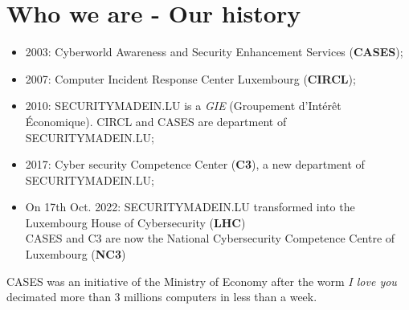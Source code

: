 %
%
\section*{Who we are - Our history}
\begin{frame}
  \begin{center}
    \begin{itemize}
      \item 2003: Cyberworld Awareness and Security Enhancement Services (\textbf{CASES});
      \item 2007: Computer Incident Response Center Luxembourg (\textbf{CIRCL});
      \item 2010: SECURITYMADEIN.LU is a \textit{GIE} (Groupement d’Intérêt Économique). CIRCL and CASES are department of SECURITYMADEIN.LU;
      \item 2017: Cyber security Competence Center (\textbf{C3}), a new department of SECURITYMADEIN.LU;
      \item On 17th Oct. 2022: SECURITYMADEIN.LU transformed into the Luxembourg House of Cybersecurity (\textbf{LHC})\\
        CASES and C3 are now the National Cybersecurity Competence Centre of Luxembourg (\textbf{NC3})
    \end{itemize}
  \end{center}
  CASES was an initiative of the Ministry of Economy after the worm
  \textit{I love you} decimated more than 3 millions computers in less than a week.
\end{frame}

%
%


